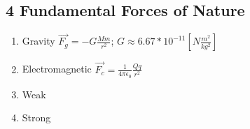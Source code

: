 \documentclass{article}
\begin{document}
\subsection{4 Fundamental Forces of Nature}
\begin{enumerate}
	\item Gravity $\vec{F_g} = -G\frac{Mm}{r^2}$; $G\approx 6.67 * 10^{-11}[N\frac{m^2}{kg^2}]$
	\item Electromagnetic $\vec{F_c} = \frac{1}{4\pi\epsilon_0}\frac{Qq}{r^2}$
	\item Weak
	\item Strong
\end{enumerate}
\end{document}
